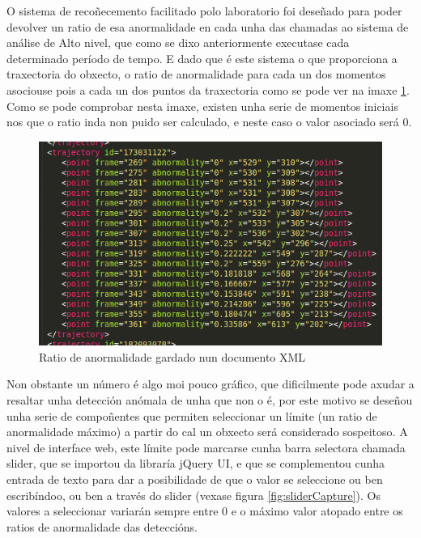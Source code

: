     O sistema de recoñecemento facilitado polo laboratorio foi deseñado para poder devolver un ratio
    de esa anormalidade en cada unha das chamadas ao sistema de análise de Alto nivel, que como se 
    dixo anteriormente executase cada determinado período de tempo. E dado que é este sistema o que
    proporciona a traxectoria do obxecto, o ratio de anormalidade para cada un dos momentos 
    asociouse pois a cada un dos puntos da traxectoria como se pode ver na imaxe \ref{fig:abXmlRate}.
    Como se pode comprobar nesta imaxe, existen unha serie de momentos iniciais nos que o ratio inda
    non puido ser calculado, e neste caso o valor asociado será 0.
    
    \begin{figure}[htp]
    \begin{center}
        \includegraphics[scale=0.5]{figures/abXmlRate.png}
        \caption{Ratio de anormalidade gardado nun documento XML}
    \label{fig:abXmlRate}
    \end{center}
    \end{figure}
    
    Non obstante un número é algo moi pouco gráfico, que dificilmente pode axudar a resaltar unha 
    detección anómala de unha que non o é, por este motivo se deseñou unha serie de compoñentes que
    permiten seleccionar un límite (un ratio de anormalidade máximo) a partir do cal un obxecto será
    considerado sospeitoso. A nivel de interface web, este límite pode marcarse cunha barra 
    selectora chamada slider, que  se importou da libraría jQuery UI\cite{ComponenteSliderJqueryUi},
    e que se complementou cunha entrada de texto para dar a posibilidade de que o valor se seleccione
    ou ben escribíndoo, ou ben a través do slider (vexase figura \ref{fig:sliderCapture}).
    Os valores a seleccionar variarán sempre entre 0 e o máximo valor atopado entre os ratios de
    anormalidade das deteccións.

